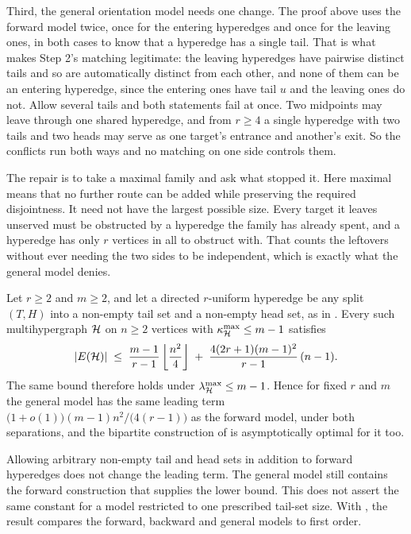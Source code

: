 Third, the general orientation model needs one change. The proof above uses
the forward model twice, once for the entering hyperedges and once for the leaving ones, in both cases to know that a hyperedge
has a single tail. That is what makes Step 2's matching legitimate: the leaving
hyperedges have pairwise distinct tails and so are automatically distinct from
each other, and none of them can be an entering hyperedge, since the entering
ones have tail $u$ and the leaving ones do not. Allow several tails and both
statements fail at once. Two midpoints may leave through one shared hyperedge,
and from $r \ge 4$ a single hyperedge with two tails and two heads may serve as
one target's entrance and another's exit. So the conflicts run both ways and no
matching on one side controls them.

The repair is to take a maximal family and ask what stopped it. Here maximal
means that no further route can be added while preserving the required disjointness.
It need not have the largest possible size. Every target it
leaves unserved must be obstructed by a hyperedge the family has already spent,
and a hyperedge has only $r$ vertices in all to obstruct with. That counts the
leftovers without ever needing the two sides to be independent, which is exactly
what the general model denies.

\begin{theorem}\label{thm:dir-hyper-general-constant}
Let $r \ge 2$ and $m \ge 2$, and let a directed $r$-uniform hyperedge be any split
$(T, H)$ into a non-empty tail set and a non-empty head set, as in
. Every such multihypergraph $\mathcal{H}$ on $n \ge 2$
vertices with $\kappa^{\max}_{\mathcal{H}} \le m-1$ satisfies
\[
    |E(\mathcal{H})| \;\le\; \frac{m-1}{r-1}\left\lfloor \frac{n^2}{4} \right\rfloor
    \;+\; \frac{4(2r+1)(m-1)^2}{r-1}\,(n-1) .
\]
The same bound therefore holds under $\lambda^{\max}_{\mathcal{H}} \le m-1$. Hence for fixed
$r$ and $m$ the general model has the same leading term
$\bigl(1+o(1)\bigr)(m-1)n^2/\bigl(4(r-1)\bigr)$ as the forward model, under both
separations, and the bipartite construction of  is
asymptotically optimal for it too.
\end{theorem}

Allowing arbitrary non-empty tail and head sets in addition to forward hyperedges does not change the leading term. The general model still contains the forward construction that supplies the lower bound. This does not assert the same constant for a model restricted to one prescribed tail-set size. With , the result compares the forward, backward and general models to first order.

